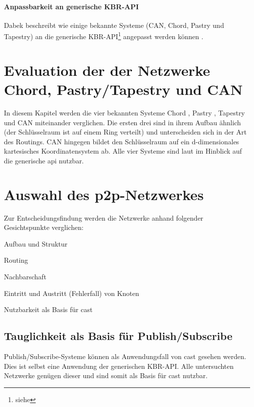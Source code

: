 \paragraph{Anpassbarkeit an generische KBR-API}
Dabek beschreibt wie einige bekannte Systeme (CAN, Chord, Pastry und Tapestry) an die generische KBR-API\footnote{siehe } angepasst werden können \cite{Dabek2003Towards}.

\section[Evaluation dreier p2p-Netzwerke]{Evaluation der der Netzwerke Chord, Pastry/Tapestry und CAN}
In diesem Kapitel werden die vier bekannten Systeme Chord \cite{Stoica2003}, Pastry \cite{Rowstron2001}, Tapestry \cite{Zhao2001Tapestry,Zhao2004Tapestry} und CAN \cite{Ratnasamy2001Scalable} miteinander verglichen. Die ersten drei sind in ihrem Aufbau ähnlich (der Schlüsselraum ist auf einem Ring verteilt) und unterscheiden sich in der Art des Routings. CAN hingegen bildet den Schlüsselraum auf ein d-dimensionales kartesisches Koordinatensystem ab. Alle vier Systeme sind laut \cite{Dabek2003Towards} im Hinblick auf die generische \ac{api} nutzbar.





\section{Auswahl des p2p-Netzwerkes}

Zur Entscheidungsfindung werden die Netzwerke anhand folgender Gesichtspunkte verglichen:
\begin{itemize*}
\item Aufbau und Struktur
\item Routing
\item Nachbarschaft
\item Eintritt und Austritt (Fehlerfall) von Knoten
\item Nutzbarkeit als Basis für \ac{cast}
\end{itemize*}


\subsection*{Tauglichkeit als Basis für Publish/Subscribe}
Publish/Subscribe-Systeme können als Anwendungsfall von \ac{cast} gesehen werden. Dies ist selbst eine Anwendung der generischen KBR-API. Alle untersuchten Netzwerke genügen dieser und sind somit als Basis für \ac{cast} nutzbar.

